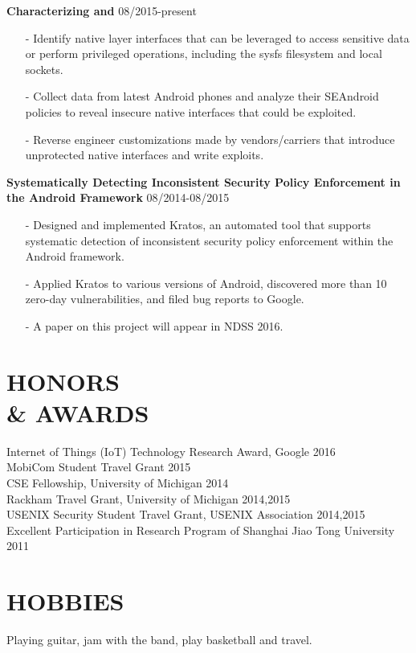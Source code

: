 \documentclass[margin]{res}
\begin{document}
\begin{resume}
{\textbf{Characterizing and } \hfill 08/2015-present 
\begin{itemize}
\item[-] Identify native layer interfaces that can be leveraged to access sensitive data or perform privileged operations, including the sysfs filesystem and local sockets.\itemsep -2pt
\item[-] Collect data from latest Android phones and analyze their SEAndroid policies to reveal insecure native interfaces that could be exploited.\itemsep -2pt
\item[-] Reverse engineer customizations made by vendors/carriers that introduce unprotected native interfaces and write exploits.
\end{itemize}

\textbf{Systematically Detecting Inconsistent Security Policy Enforcement in the Android Framework} \hfill 08/2014-08/2015
\begin{itemize}
\item[-] Designed and implemented Kratos, an automated tool that supports systematic detection of inconsistent security policy enforcement within the Android framework. \itemsep -2pt
\item[-] Applied Kratos to various versions of Android, discovered more than 10 zero-day vulnerabilities, and filed bug reports to Google. \itemsep -2pt
\item[-] A paper on this project will appear in NDSS 2016.
\end{itemize}
}


\section{HONORS\\ \& AWARDS}
Internet of Things (IoT) Technology Research Award, Google \hfill 2016\\
MobiCom Student Travel Grant \hfill 2015 \\
CSE Fellowship, University of Michigan \hfill 2014 \\
Rackham Travel Grant, University of Michigan \hfill 2014,2015 \\
USENIX Security Student Travel Grant, USENIX Association \hfill 2014,2015 \\
Excellent Participation in Research Program of Shanghai Jiao Tong University \hfill 2011 \\

\section{HOBBIES}
Playing guitar, jam with the band, play basketball and travel. 
\end{resume}
\end{document}
